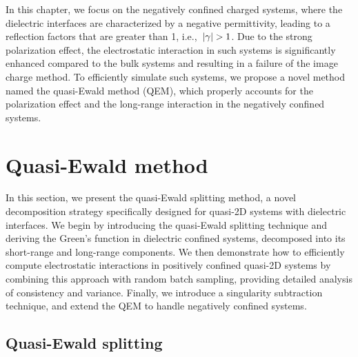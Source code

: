 In this chapter, we focus on the negatively confined charged systems, where the dielectric interfaces are characterized by a negative permittivity, leading to a reflection factors that are greater than 1, i.e.,~$\lvert\gamma\rvert > 1$.
Due to the strong polarization effect, the electrostatic interaction in such systems is significantly enhanced compared to the bulk systems and resulting in a failure of the image charge method.
To efficiently simulate such systems, we propose a novel method named the quasi-Ewald method (QEM), which properly accounts for the polarization effect and the long-range interaction in the negatively confined systems.

\section{Quasi-Ewald method}

In this section, we present the quasi-Ewald splitting method, a novel decomposition strategy specifically designed for quasi-2D systems with dielectric interfaces. 
We begin by introducing the quasi-Ewald splitting technique and deriving the Green's function in dielectric confined systems, decomposed into its short-range and long-range components.
We then demonstrate how to efficiently compute electrostatic interactions in positively confined quasi-2D systems by combining this approach with random batch sampling, providing detailed analysis of consistency and variance.
Finally, we introduce a singularity subtraction technique, and extend the QEM to handle negatively confined systems.

\subsection{Quasi-Ewald splitting}

